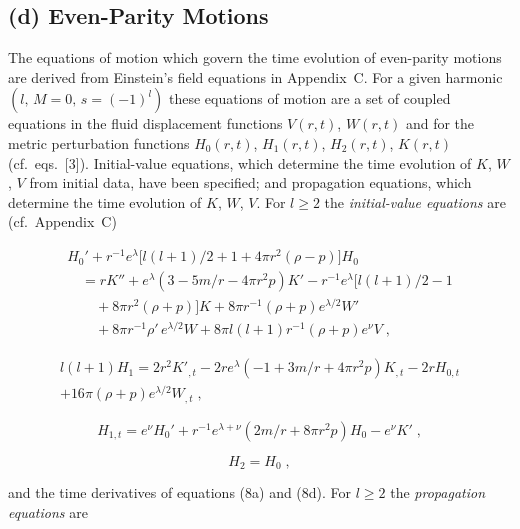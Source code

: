 \documentclass[12pt]{article}
\begin{document}
\subsection*{(d) Even-Parity Motions}

The equations of motion which govern the time evolution of even-parity motions are
derived from Einstein's field equations in Appendix~C\@. For a given harmonic
$(l,\,M=0,\,s=(-1)^{l})$ these equations of motion are a set of coupled equations in the
fluid displacement functions $V(r,t)$, $W(r,t)$ and for the metric perturbation functions
$H_0(r,t)$, $H_1(r,t)$, $H_2(r,t)$, $K(r,t)$ (cf.\ eqs.\ [3]). Initial-value equations, which
determine the time evolution of $K$, $W$, $V$ from initial data, have been specified; and
propagation equations, which determine the time evolution of $K$, $W$, $V$. For $l\geq 2$
the \emph{initial-value equations} are (cf.\ Appendix~C)

\begin{equation}
\begin{split}
H_0' + r^{-1}e^{\lambda}\bigl[l(l+1)/2 + 1 + 4\pi r^2(\rho-p)\bigr]H_0 \\
\quad = rK'' + e^{\lambda}(3-5m/r-4\pi r^2 p)K'
  - r^{-1}e^{\lambda}\bigl[l(l+1)/2 - 1 \\
\qquad + 8\pi r^2(\rho+p)\bigr]K
  + 8\pi r^{-1}(\rho+p)e^{\lambda/2}W' \\
\qquad + 8\pi r^{-1}\rho'\,e^{\lambda/2}W
  + 8\pi l(l+1)r^{-1}(\rho+p)e^{\nu}V \;,
\end{split}
\tag{8a}
\end{equation}

\begin{equation}
\begin{split}
l(l+1)H_1 = 2r^2 K'_{,t} - 2re^{\lambda}(-1+3m/r+4\pi r^2 p)K_{,t}
  - 2rH_{0,t} \\
  + 16\pi(\rho+p)e^{\lambda/2}W_{,t} \;,
\end{split}
\tag{8b}
\end{equation}

\begin{equation}
H_{1,t} = e^{\nu}H_0' + r^{-1}e^{\lambda+\nu}(2m/r+8\pi r^2 p)H_0 - e^{\nu}K' \;,
\tag{8c}
\end{equation}

\begin{equation}
H_2 = H_0 \;,
\tag{8d}
\end{equation}

and the time derivatives of equations (8a) and (8d). For $l\geq 2$ the \emph{propagation
equations} are
\end{document}
